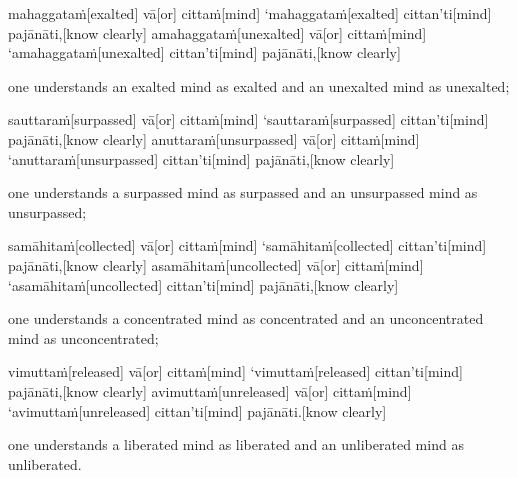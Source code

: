 \begin{samepage}
\begingl[glneveryline={\PaliGlossA,\PaliGlossB}]
mahaggataṁ[exalted] vā[or] cittaṁ[mind] ‘mahaggataṁ[exalted] cittan’ti[mind] pajānāti,[know clearly] amahaggataṁ[unexalted] vā[or] cittaṁ[mind] ‘amahaggataṁ[unexalted] cittan’ti[mind] pajānāti,[know clearly]
\endgl
\nopagebreak
\linespread{0.5}
\begin{spacin}{0.2}
{\PaliGlossFT one understands an exalted mind as exalted and an unexalted mind as unexalted;}
\end{spacin}
\vskip 12pt
\end{samepage}
\begin{samepage}
\begingl[glneveryline={\PaliGlossA,\PaliGlossB}]
sauttaraṁ[surpassed] vā[or] cittaṁ[mind] ‘sauttaraṁ[surpassed] cittan’ti[mind] pajānāti,[know clearly] anuttaraṁ[unsurpassed] vā[or] cittaṁ[mind] ‘anuttaraṁ[unsurpassed] cittan’ti[mind] pajānāti,[know clearly]
\endgl
\nopagebreak
\linespread{0.5}
\begin{spacin}{0.2}
{\PaliGlossFT one understands a surpassed mind as surpassed and an unsurpassed mind as unsurpassed;}
\end{spacin}
\vskip 12pt
\end{samepage}
\begin{samepage}
\begingl[glneveryline={\PaliGlossA,\PaliGlossB}]
samāhitaṁ[collected] vā[or] cittaṁ[mind] ‘samāhitaṁ[collected] cittan’ti[mind] pajānāti,[know clearly] asamāhitaṁ[uncollected] vā[or] cittaṁ[mind] ‘asamāhitaṁ[uncollected] cittan’ti[mind] pajānāti,[know clearly]
\endgl
\nopagebreak
\linespread{0.5}
\begin{spacin}{0.2}
{\PaliGlossFT one understands a concentrated mind as concentrated and an unconcentrated mind as unconcentrated;}
\end{spacin}
\vskip 12pt
\end{samepage}
\begin{samepage}
\begingl[glneveryline={\PaliGlossA,\PaliGlossB}]
vimuttaṁ[released] vā[or] cittaṁ[mind] ‘vimuttaṁ[released] cittan’ti[mind] pajānāti,[know clearly] avimuttaṁ[unreleased] vā[or] cittaṁ[mind] ‘avimuttaṁ[unreleased] cittan’ti[mind] pajānāti.[know clearly]
\endgl
\nopagebreak
\linespread{0.5}
\begin{spacin}{0.2}
{\PaliGlossFT one understands a liberated mind as liberated and an unliberated mind as unliberated.}
\end{spacin}
\vskip 12pt
\end{samepage}

